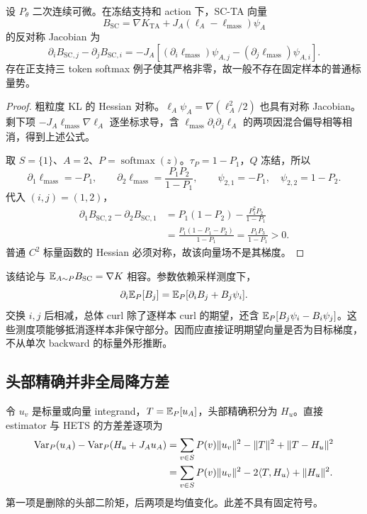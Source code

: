 \begin{proposition}[SC-TA 的固定样本场一般非保守]
\label{est:sc-curl}
设 $P_\theta$ 二次连续可微。在冻结支持和 action 下，SC-TA 向量
\begin{equation}
B_{\mathrm{SC}}=\nabla K_{\mathrm{TA}}+J_A(\ell_A-\ell_{\mathrm{mass}})\psi_A
\end{equation}
的反对称 Jacobian 为
\begin{equation}
\partial_iB_{\mathrm{SC},j}-\partial_jB_{\mathrm{SC},i}
=-J_A\left[(\partial_i\ell_{\mathrm{mass}})\psi_{A,j}
-(\partial_j\ell_{\mathrm{mass}})\psi_{A,i}\right].
\end{equation}
存在正支持三 token softmax 例子使其严格非零，故一般不存在固定样本的普通标量势。
\end{proposition}
\begin{proof}
粗粒度 KL 的 Hessian 对称。$\ell_A\psi_A=\nabla(\ell_A^2/2)$ 也具有对称 Jacobian。剩下项 $-J_A\ell_{\mathrm{mass}}\nabla\ell_A$ 逐坐标求导，含 $\ell_{\mathrm{mass}}\partial_i\partial_j\ell_A$ 的两项因混合偏导相等相消，得到上述公式。

取 $S=\{1\}$、$A=2$、$P=\operatorname{softmax}(z)$。$\tau_P=1-P_1$，$Q$ 冻结，所以
\begin{equation}
\partial_1\ell_{\mathrm{mass}}=-P_1,\qquad
\partial_2\ell_{\mathrm{mass}}=\frac{P_1P_2}{1-P_1},\qquad
\psi_{2,1}=-P_1,\quad\psi_{2,2}=1-P_2.
\end{equation}
代入 $(i,j)=(1,2)$，
\begin{align}
\partial_1B_{\mathrm{SC},2}-\partial_2B_{\mathrm{SC},1}
&=P_1(1-P_2)-\frac{P_1^2P_2}{1-P_1}\\
&=\frac{P_1(1-P_1-P_2)}{1-P_1}
=\frac{P_1P_3}{1-P_1}>0.
\end{align}
普通 $C^2$ 标量函数的 Hessian 必须对称，故该向量场不是其梯度。
\end{proof}

该结论与 $\mathbb E_{A\sim P}B_{\mathrm{SC}}=\nabla K$ 相容。参数依赖采样测度下，
\begin{equation}
\partial_i\mathbb E_P[B_j]=\mathbb E_P[\partial_iB_j+B_j\psi_i].
\end{equation}
交换 $i,j$ 后相减，总体 curl 除了逐样本 curl 的期望，还含 $\mathbb E_P[B_j\psi_i-B_i\psi_j]$。这些测度项能够抵消逐样本非保守部分。因而应直接证明期望向量是否为目标梯度，不从单次 backward 的标量外形推断。

\subsection{头部精确并非全局降方差}
\label{est:hets-counterexamples}
令 $u_v$ 是标量或向量 integrand，$T=\mathbb E_P[u_A]$，头部精确积分为 $H_u$。直接 estimator 与 HETS 的方差差逐项为
\begin{align}
\operatorname{Var}_P(u_A)-\operatorname{Var}_P(H_u+J_Au_A)
&=\sum_{v\in S}P(v)\|u_v\|^2-\|T\|^2+\|T-H_u\|^2\\
&=\sum_{v\in S}P(v)\|u_v\|^2-2\langle T,H_u\rangle+\|H_u\|^2.
\end{align}
第一项是删除的头部二阶矩，后两项是均值变化。此差不具有固定符号。

